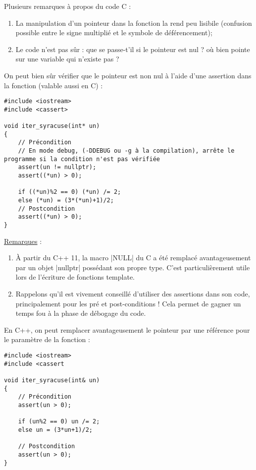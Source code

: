 \begin{itemize}
Plusieurs remarques à propos du code C :
\begin{enumerate}
    \item La manipulation d'un pointeur dans la fonction la rend peu lisibile (confusion possible entre le signe multiplié et le symbole de déférencement);
    \item Le code n'est pas sûr : que se passe-t'il si le pointeur est nul ? où bien pointe sur une variable qui n'existe pas ?
\end{enumerate}

On peut bien sûr vérifier que le pointeur est non nul à l'aide d'une assertion dans la fonction (valable aussi en C) :
\begin{lstlisting}[caption=fonction C avec modification des arguments d'entrée]
#include <iostream>
#include <cassert>

void iter_syracuse(int* un)
{
    // Précondition
    // En mode debug, (-DDEBUG ou -g à la compilation), arrête le programme si la condition n'est pas vérifiée
    assert(un != nullptr); 
    assert((*un) > 0);

    if ((*un)%2 == 0) (*un) /= 2;
    else (*un) = (3*(*un)+1)/2;
    // Postcondition
    assert((*un) > 0);
}
\end{lstlisting}

\underline{Remarques} : 
\begin{enumerate}
    \item À partir du C++ 11, la macro |NULL| du C a été remplacé avantageusement par un objet |nullptr| possédant son propre type. C'est particulièrement utile lors de l'écriture de fonctions template.
    \item Rappelons qu'il est vivement conseillé d'utiliser des assertions dans son code, principalement pour les pré et post-conditions ! Cela permet de gagner un temps fou à la phase de débogage du code. 
\end{enumerate}

En C++, on peut remplacer avantageusement le pointeur par une référence pour le paramètre de la fonction :
\begin{lstlisting}[caption=fonction C avec modification des arguments d'entrée]
#include <iostream>
#include <cassert

void iter_syracuse(int& un)
{
    // Précondition
    assert(un > 0);

    if (un%2 == 0) un /= 2;
    else un = (3*un+1)/2;

    // Postcondition
    assert(un > 0);
}


\end{lstlisting}
\end{itemize}

